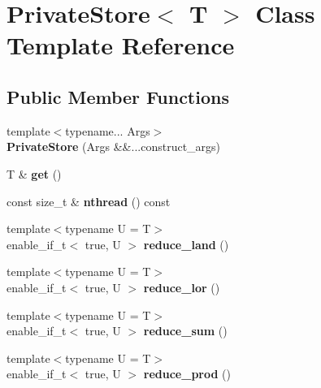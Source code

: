 \hypertarget{classPrivateStore}{}\section{Private\+Store$<$ T $>$ Class Template Reference}
\label{classPrivateStore}
\subsection*{Public Member Functions}
\begin{DoxyCompactItemize}
\item 
{\footnotesize template$<$typename... Args$>$ }\\{\bfseries Private\+Store} (Args \&\&...construct\+\_\+args)\hypertarget{classPrivateStore_ae34fa85ed50cff354fb3436d6601b1ba}{}\label{classPrivateStore_ae34fa85ed50cff354fb3436d6601b1ba}

\item 
T \& {\bfseries get} ()\hypertarget{classPrivateStore_a206a923461b45f71e77b0964a742bb80}{}\label{classPrivateStore_a206a923461b45f71e77b0964a742bb80}

\item 
const size\+\_\+t \& {\bfseries nthread} () const \hypertarget{classPrivateStore_adbacf9b611bdafa806019ff27c3e214d}{}\label{classPrivateStore_adbacf9b611bdafa806019ff27c3e214d}

\item 
{\footnotesize template$<$typename U  = T$>$ }\\enable\+\_\+if\+\_\+t$<$ true, U $>$ {\bfseries reduce\+\_\+land} ()\hypertarget{classPrivateStore_a29e7e0c66ee7bb06ff7bb82a0d80e44d}{}\label{classPrivateStore_a29e7e0c66ee7bb06ff7bb82a0d80e44d}

\item 
{\footnotesize template$<$typename U  = T$>$ }\\enable\+\_\+if\+\_\+t$<$ true, U $>$ {\bfseries reduce\+\_\+lor} ()\hypertarget{classPrivateStore_ad2b31dcc4093c196a616d97e10471115}{}\label{classPrivateStore_ad2b31dcc4093c196a616d97e10471115}

\item 
{\footnotesize template$<$typename U  = T$>$ }\\enable\+\_\+if\+\_\+t$<$ true, U $>$ {\bfseries reduce\+\_\+sum} ()\hypertarget{classPrivateStore_a23e691021ad5f526b62c55e29879b8f4}{}\label{classPrivateStore_a23e691021ad5f526b62c55e29879b8f4}

\item 
{\footnotesize template$<$typename U  = T$>$ }\\enable\+\_\+if\+\_\+t$<$ true, U $>$ {\bfseries reduce\+\_\+prod} ()\hypertarget{classPrivateStore_a4bc59bf0807be0b004866ed9cde5e7ee}{}\label{classPrivateStore_a4bc59bf0807be0b004866ed9cde5e7ee}


\end{DoxyCompactItemize}
